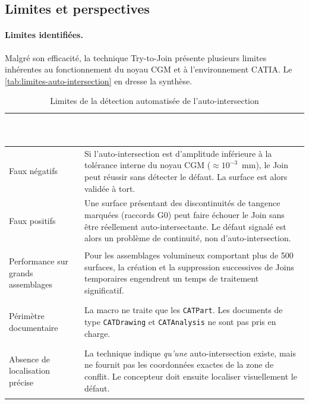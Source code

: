 \subsection{Limites et perspectives}

\paragraph{Limites identifiées.}
Malgré son efficacité, la technique Try-to-Join présente plusieurs limites inhérentes au fonctionnement du noyau CGM et à l'environnement CATIA. Le \autoref{tab:limites-auto-intersection} en dresse la synthèse.

\begin{table}[H]
    \centering
    \caption{Limites de la détection automatisée de l'auto-intersection}
    \label{tab:limites-auto-intersection}
    \begin{tabularx}{\textwidth}{|>{\bfseries\raggedright\arraybackslash}p{3.8cm}|X|}
        \hline
        \rowcolor{headerblue}
        \textcolor{white}{\textbf{Limite}} & \centering\textcolor{white}{\textbf{Explication}} \tabularnewline
        \hline
        \rowcolor{rowlight}
        Faux négatifs & Si l'auto-intersection est d'amplitude inférieure à la tolérance interne du noyau CGM ($\approx 10^{-3}$~mm), le Join peut réussir sans détecter le défaut. La surface est alors validée à tort. \\
        \hline
        \rowcolor{rowwhite}
        Faux positifs & Une surface présentant des discontinuités de tangence marquées (raccords G0) peut faire échouer le Join sans être réellement auto-intersectante. Le défaut signalé est alors un problème de continuité, non d'auto-intersection. \\
        \hline
        \rowcolor{rowlight}
        Performance sur grands assemblages & Pour les assemblages volumineux comportant plus de 500 surfaces, la création et la suppression successives de Joins temporaires engendrent un temps de traitement significatif. \\
        \hline
        \rowcolor{rowwhite}
        Périmètre documentaire & La macro ne traite que les \texttt{CATPart}. Les documents de type \texttt{CATDrawing} et \texttt{CATAnalysis} ne sont pas pris en charge. \\
        \hline
        \rowcolor{rowlight}
        Absence de localisation précise & La technique indique \textit{qu'une} auto-intersection existe, mais ne fournit pas les coordonnées exactes de la zone de conflit. Le concepteur doit ensuite localiser visuellement le défaut. \\
        \hline
    \end{tabularx}
\end{table}

